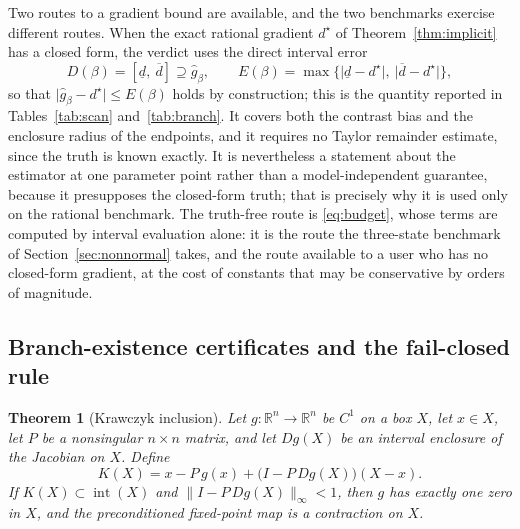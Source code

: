 \documentclass[11pt]{article}
\newtheorem{theorem}{Theorem}
\theoremstyle{definition}
\theoremstyle{remark}
\newcommand{\R}{\mathbb{R}}
\newcommand{\norm}[1]{\lVert #1 \rVert}
\newcommand{\abs}[1]{\lvert #1 \rvert}
\begin{document}
Two routes to a gradient bound are available, and the two benchmarks exercise different routes. When
the exact rational gradient $d^\star$ of Theorem~\ref{thm:implicit} has a closed form, the verdict
uses the direct interval error
\begin{equation}
D(\beta) = [\underline d,\ \overline d] \supseteq \widehat g_\beta,
\qquad
E(\beta) = \max\bigl\{\abs{\underline d - d^\star},\ \abs{\overline d - d^\star}\bigr\},
\label{eq:errdef}
\end{equation}
so that $\abs{\widehat g_\beta - d^\star} \le E(\beta)$ holds by construction; this is the
quantity reported in Tables~\ref{tab:scan} and~\ref{tab:branch}. It covers both the contrast bias
and the enclosure radius of the endpoints, and it requires no Taylor remainder estimate, since the
truth is known exactly. It is nevertheless a statement about the estimator at one parameter point
rather than a model-independent guarantee, because it presupposes the closed-form truth; that is
precisely why it is used only on the rational benchmark. The truth-free route is
\eqref{eq:budget}, whose terms are computed by interval evaluation alone: it is the route the
three-state benchmark of Section~\ref{sec:nonnormal} takes, and the route available to a user who
has no closed-form gradient, at the cost of constants that may be conservative by orders of
magnitude.

\subsection{Branch-existence certificates and the fail-closed rule}

\begin{theorem}[Krawczyk inclusion]\label{thm:krawczyk}
Let $g: \R^n \to \R^n$ be $C^1$ on a box $X$, let $x \in X$, let $P$ be a nonsingular
$n\times n$ matrix, and let $D g(X)$ be an interval enclosure of the Jacobian on $X$. Define
\begin{equation}
K(X) = x - P\,g(x) + \bigl(I - P\,Dg(X)\bigr)(X - x).
\label{eq:krawczyk}
\end{equation}
If $K(X) \subset \operatorname{int}(X)$ and $\norm{I - P\,Dg(X)}_{\infty} < 1$, then $g$ has
exactly one zero in $X$, and the preconditioned fixed-point map is a contraction on $X$.
\end{theorem}
\end{document}
